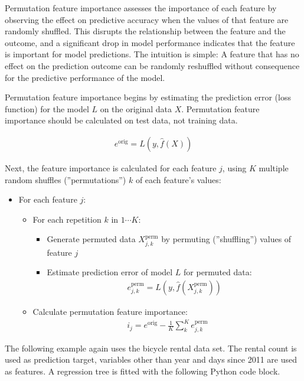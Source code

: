 Permutation feature importance assesses the importance of each feature by observing the effect on predictive accuracy when the values of that feature are randomly shuffled. This disrupts the relationship between the feature and the outcome, and a significant drop in model performance indicates that the feature is important for model predictions. The intuition is simple: A feature that has no effect on the prediction outcome can be randomly reshuffled without consequence for the predictive performance of the model.

Permutation feature importance begins by estimating the prediction error (loss function) for the model $L$ on the original data $X$. Permutation feature importance should be calculated on test data, not training data.

\begin{align*}
e^{\text{orig}} = L(y, \hat{f}(X))
\end{align*}

Next, the feature importance is calculated for each feature $j$, using $K$ multiple random shuffles (''permutations'') $k$ of each feature's values:

\begin{itemize}
\item For each feature $j$:
  \begin{itemize}
     \item For each repetition $k$ in $1 \cdots K$:
     \begin{itemize}
        \item Generate permuted data $X^{\text{perm}}_{j, k}$ by permuting (''shuffling'') values of feature $j$
        \item Estimate prediction error of model $L$ for permuted data:
        \begin{align*}e^{\text{perm}}_{j, k} = L(y, \hat{f}(X^{\text{perm}}_{j, k}))\end{align*}
     \end{itemize}
     \item Calculate permutation feature importance: 
     \begin{align*}i_j = e^{\text{orig}} - \frac{1}{K}\sum_k^K e^{\text{perm}}_{j, k}\end{align*}
  \end{itemize}
\end{itemize}

The following example again uses the bicycle rental data set. The rental count is used as prediction target, variables other than year and days since 2011 are used as features. A regression tree is fitted with the following Python code block.

